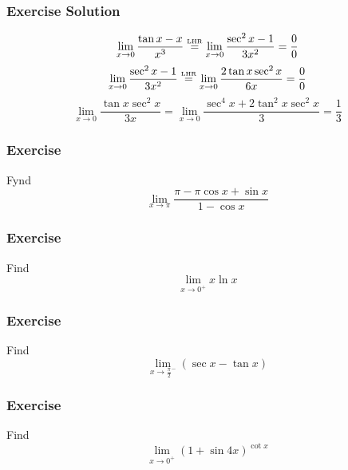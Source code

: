 \documentclass[xcolor=dvipsnames]{beamer}
\begin{document}
\begin{frame}
  \frametitle{Exercise Solution}
  \begin{equation}
    \label{eq:puyiepie}
    \lim_{x\rightarrow{}0}\frac{\tan{}x-x}{x^{3}}\stackrel{\mbox{\tiny LHR}}{=}\lim_{x\rightarrow{}0}\frac{\sec^{2}x-1}{3x^{2}}=\frac{0}{0}
  \end{equation}
\bigskip
  \begin{equation}
    \label{eq:aedeinah}
    \lim_{x\rightarrow{}0}\frac{\sec^{2}x-1}{3x^{2}}\stackrel{\mbox{\tiny LHR}}{=}\lim_{x\rightarrow{}0}\frac{2\tan{}x\sec^{2}x}{6x}=\frac{0}{0}
  \end{equation}
\bigskip
  \begin{equation}
    \label{eq:teipaeka}
    \lim_{x\rightarrow{}0}\frac{\tan{}x\sec^{2}x}{3x}=\lim_{x\rightarrow{}0}\frac{\sec^{4}x+2\tan^{2}x\sec^{2}x}{3}=\frac{1}{3}
  \end{equation}
\end{frame}

\begin{frame}
  \frametitle{Exercise}
  {\ubung} Fynd
  \begin{equation}
    \label{eq:eekuyuoc}
    \lim_{x\rightarrow\pi}\frac{\pi-\pi\cos{}x+\sin{}x}{1-\cos{}x}
  \end{equation}
\end{frame}

\begin{frame}
  \frametitle{Exercise}
  {\ubung} Find
  \begin{equation}
    \label{eq:zeisahda}
    \lim_{x\rightarrow{}0^{+}}x\ln{}x
  \end{equation}
\end{frame}

\begin{frame}
  \frametitle{Exercise}
  {\ubung} Find
  \begin{equation}
    \label{eq:ahgohgah}
    \lim_{x\rightarrow\frac{\pi}{2}^{-}}(\sec{}x-\tan{}x)
  \end{equation}
\end{frame}

\begin{frame}
  \frametitle{Exercise}
  {\ubung} Find
  \begin{equation}
    \label{eq:xughieta}
    \lim_{x\rightarrow{}0^{+}}(1+\sin{}4x)^{\cot{}x}
  \end{equation}
\end{frame}
\end{document}
